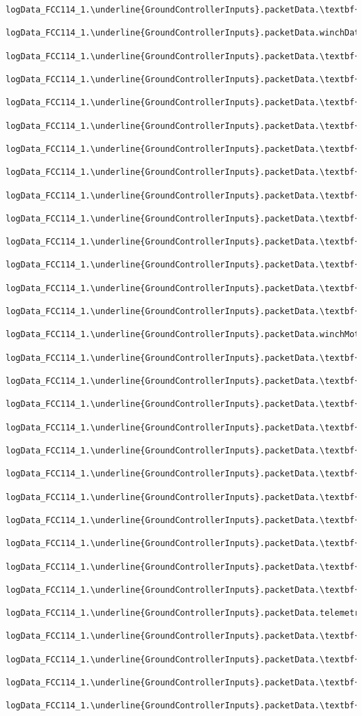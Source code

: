 \documentclass[10pt]{extarticle}
\begin{document}
\begin{Verbatim}[baselinestretch=.9,commandchars=\\\{\}]
logData_FCC114_1.\underline{GroundControllerInputs}.packetData.\textbf{DF_winchData}

logData_FCC114_1.\underline{GroundControllerInputs}.packetData.winchData
    logData_FCC114_1.\underline{GroundControllerInputs}.packetData.\textbf{winchData.winchID}
    logData_FCC114_1.\underline{GroundControllerInputs}.packetData.\textbf{winchData.state}
    logData_FCC114_1.\underline{GroundControllerInputs}.packetData.\textbf{winchData.ecode}
    logData_FCC114_1.\underline{GroundControllerInputs}.packetData.\textbf{winchData.alarm0}
    logData_FCC114_1.\underline{GroundControllerInputs}.packetData.\textbf{winchData.alarm1}
    logData_FCC114_1.\underline{GroundControllerInputs}.packetData.\textbf{winchData.alarm2}
    logData_FCC114_1.\underline{GroundControllerInputs}.packetData.\textbf{winchData.speed_demand}
    logData_FCC114_1.\underline{GroundControllerInputs}.packetData.\textbf{winchData.length_total}
    logData_FCC114_1.\underline{GroundControllerInputs}.packetData.\textbf{winchData.length_on_drum}
    logData_FCC114_1.\underline{GroundControllerInputs}.packetData.\textbf{winchData.tether_speed}
    logData_FCC114_1.\underline{GroundControllerInputs}.packetData.\textbf{winchData.tether_tension}

logData_FCC114_1.\underline{GroundControllerInputs}.packetData.\textbf{DF_winchMotorData}

logData_FCC114_1.\underline{GroundControllerInputs}.packetData.winchMotorData
    logData_FCC114_1.\underline{GroundControllerInputs}.packetData.\textbf{winchMotorData.alarms}
    logData_FCC114_1.\underline{GroundControllerInputs}.packetData.\textbf{winchMotorData.dc_voltage}
    logData_FCC114_1.\underline{GroundControllerInputs}.packetData.\textbf{winchMotorData.stator_freq}
    logData_FCC114_1.\underline{GroundControllerInputs}.packetData.\textbf{winchMotorData.rms_current}
    logData_FCC114_1.\underline{GroundControllerInputs}.packetData.\textbf{winchMotorData.active_power}
    logData_FCC114_1.\underline{GroundControllerInputs}.packetData.\textbf{winchMotorData.active_current}
    logData_FCC114_1.\underline{GroundControllerInputs}.packetData.\textbf{winchMotorData.torque}
    logData_FCC114_1.\underline{GroundControllerInputs}.packetData.\textbf{winchMotorData.actual_freq}
    logData_FCC114_1.\underline{GroundControllerInputs}.packetData.\textbf{winchMotorData.output_rms_voltage}
    logData_FCC114_1.\underline{GroundControllerInputs}.packetData.\textbf{winchMotorData.error_count}

logData_FCC114_1.\underline{GroundControllerInputs}.packetData.\textbf{DF_telemetrySync}

logData_FCC114_1.\underline{GroundControllerInputs}.packetData.telemetrySync
    logData_FCC114_1.\underline{GroundControllerInputs}.packetData.\textbf{telemetrySync.systemState}
    logData_FCC114_1.\underline{GroundControllerInputs}.packetData.\textbf{telemetrySync.numberOfPackets}
    logData_FCC114_1.\underline{GroundControllerInputs}.packetData.\textbf{telemetrySync.packetIndex}
    logData_FCC114_1.\underline{GroundControllerInputs}.packetData.\textbf{telemetrySync.syncData}
\end{Verbatim}
\end{document}
